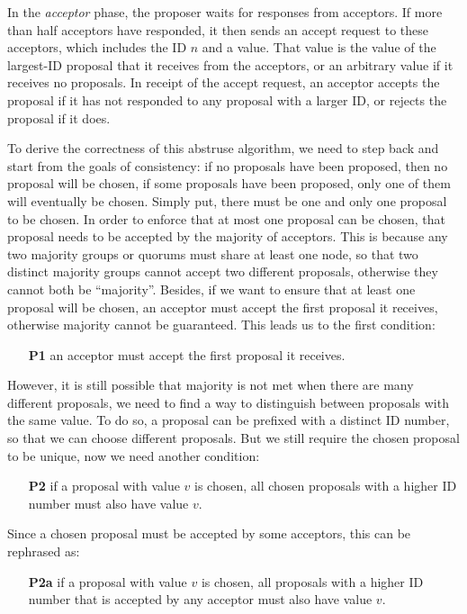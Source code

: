 \documentclass[11pt]{article}
\begin{document}
    In the \textit{acceptor} phase, the proposer waits for responses from acceptors. If more than half acceptors have responded, it then sends an accept request to these acceptors, which includes the {\footnotesize ID} $n$ and a value. That value is the value of the largest-{\footnotesize ID} proposal that it receives from the acceptors, or an arbitrary value if it receives no proposals. In receipt of the accept request, an acceptor accepts the proposal if it has not responded to any proposal with a larger {\footnotesize ID}, or rejects the proposal if it does.

    To derive the correctness of this abstruse algorithm, we need to step back and start from the goals of consistency: if no proposals have been proposed, then no proposal will be chosen, if some proposals have been proposed, only one of them will eventually be chosen. Simply put, there must be one and only one proposal to be chosen. In order to enforce that at most one proposal can be chosen, that proposal needs to be accepted by the majority of acceptors. This is because any two majority groups or quorums must share at least one node, so that two distinct majority groups cannot accept two different proposals, otherwise they cannot both be “majority”. Besides, if we want to ensure that at least one proposal will be chosen, an acceptor must accept the first proposal it receives, otherwise majority cannot be guaranteed. This leads us to the first condition:
    \begin{itemize}
      \item[\textbf{P1}] an acceptor must accept the first proposal it receives.
    \end{itemize}
    However, it is still possible that majority is not met when there are many different proposals, we need to find a way to distinguish between proposals with the same value. To do so, a proposal can be prefixed with a distinct {\footnotesize ID} number, so that we can choose different proposals. But we still require the chosen proposal to be unique, now we need another condition:
    \begin{itemize}
      \item[\textbf{P2}] if a proposal with value $v$ is chosen, all chosen proposals with a higher {\footnotesize ID} number must also have value $v$.
    \end{itemize}
    Since a chosen proposal must be accepted by some acceptors, this can be rephrased as:
    \begin{itemize}
      \item[\textbf{P2a}] if a proposal with value $v$ is chosen, all proposals with a higher {\footnotesize ID} number that is accepted by any acceptor must also have value $v$.
    \end{itemize}
\end{document}
